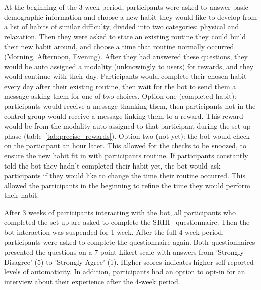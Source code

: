 \documentclass{scaffold/sigchi}
\begin{document}
At the beginning of the 3-week period, participants were asked to answer basic demographic information and choose a new habit they would like to develop from a list of habits of similar difficulty, divided into two categories: physical and relaxation. Then they were asked to state an existing routine they could build their new habit around, and choose a time that routine normally occurred (Morning, Afternoon, Evening). After they had answered these questions, they would be auto assigned a modality (unknowingly to users) for rewards, and they would continue with their day. Participants would complete their chosen habit every day after their existing routine, then wait for the bot to send them a message asking them for one of two choices.\newline
\newline
Option one (completed habit): participants would receive a message thanking them, then participants not in the control group would receive a message linking them to a reward. This reward would be from the modality auto-assigned to that participant during the set-up phase (table~\ref{tab:precise_rewards}). Option two (not yet): the bot would check on the participant an hour later. This allowed for the checks to be snoozed, to ensure the new habit fit in with participants routine. If participants constantly told the bot they hadn't completed their habit yet, the bot would ask participants if they would like to change the time their routine occurred. This allowed the participants in the beginning to refine the time they would perform their habit.

After 3 weeks of participants interacting with the bot, all participants who completed the set up are asked to complete the SRHI~\cite{article_habit_strength} questionnaire. Then the bot interaction was suspended for 1 week. After the full 4-week period, participants were asked to complete the questionnaire again. Both questionnaires presented the questions on a 7-point Likert scale with answers from 'Strongly Disagree' (5) to 'Strongly Agree' (1). Higher scores indicates higher self-reported levels of automaticity. In addition, participants had an option to opt-in for an interview about their experience after the 4-week period.
\end{document}
